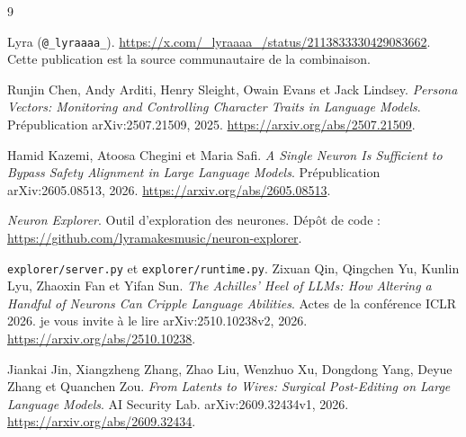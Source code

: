 \documentclass[11pt,a4paper]{article}
\begin{document}
\begin{thebibliography}{9}

Lyra (\texttt{@\_lyraaaa\_}).
\newblock
\url{https://x.com/_lyraaaa_/status/2113833330429083662}.
\newblock
Cette publication est la source communautaire de la combinaison.

Runjin Chen, Andy Arditi, Henry Sleight, Owain Evans et Jack Lindsey.
\newblock \emph{Persona Vectors: Monitoring and Controlling Character Traits
in Language Models}.
\newblock Prépublication arXiv:2507.21509, 2025.
\newblock \url{https://arxiv.org/abs/2507.21509}.

Hamid Kazemi, Atoosa Chegini et Maria Safi.
\newblock \emph{A Single Neuron Is Sufficient to Bypass Safety Alignment
in Large Language Models}.
\newblock Prépublication arXiv:2605.08513, 2026.
\newblock \url{https://arxiv.org/abs/2605.08513}.

\emph{Neuron Explorer}.
\newblock Outil d'exploration des neurones.
\newblock Dépôt de code :
\url{https://github.com/lyramakesmusic/neuron-explorer}.

\texttt{explorer/server.py} et \texttt{explorer/runtime.py}.
\bibitem{}
Zixuan Qin, Qingchen Yu, Kunlin Lyu, Zhaoxin Fan et Yifan Sun.
\newblock \emph{The Achilles' Heel of LLMs: How Altering a Handful
of Neurons Can Cripple Language Abilities}.
\newblock Actes de la conférence ICLR 2026.
\newblock je vous invite à le lire arXiv:2510.10238v2, 2026.
\newblock \url{https://arxiv.org/abs/2510.10238}.

\bibitem{}
Jiankai Jin, Xiangzheng Zhang, Zhao Liu, Wenzhuo Xu,
Dongdong Yang, Deyue Zhang et Quanchen Zou.
\newblock \emph{From Latents to Wires: Surgical Post-Editing
on Large Language Models}.
 AI Security Lab.
\newblock arXiv:2609.32434v1, 2026.
\newblock \url{https://arxiv.org/abs/2609.32434}.

\end{thebibliography}
\end{document}
